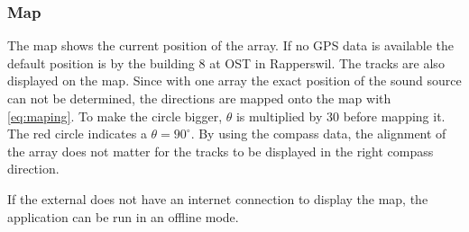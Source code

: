 \subsubsection{Map}
The map shows the current position of the array.
If no GPS data is available the default position is by the
building 8 at OST in Rapperswil.
The tracks are also displayed on the map.
Since with one array the exact position of the sound source
can not be determined, the directions are mapped onto the map with
\ref{eq:maping}.
To make the circle bigger, $\theta$ is multiplied by 30 before mapping it.
The red circle indicates a $\theta = 90^\circ$.
By using the compass data, the alignment of the array does not matter
for the tracks to be displayed in the right compass direction.

If the external does not have an internet connection to display the map,
the application can be run in an offline mode.